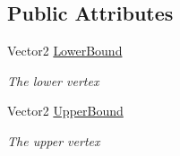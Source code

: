 \subsection*{Public Attributes}
\begin{DoxyCompactItemize}
\item 
Vector2 \hyperlink{struct_farseer_physics_1_1_collision_1_1_a_a_b_b_aa5a8a3782ec44c1ee419c19f8a5cb7d3}{Lower\+Bound}
\begin{DoxyCompactList}\small\item\em The lower vertex \end{DoxyCompactList}\item 
Vector2 \hyperlink{struct_farseer_physics_1_1_collision_1_1_a_a_b_b_a8503a517e68256b9b18be9f88f609aba}{Upper\+Bound}
\begin{DoxyCompactList}\small\item\em The upper vertex \end{DoxyCompactList}\end{DoxyCompactItemize}
